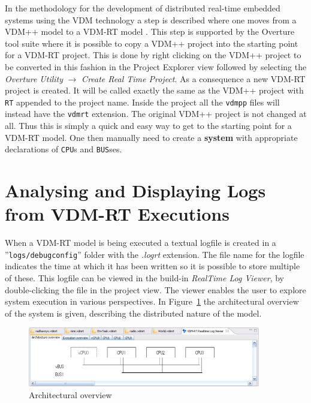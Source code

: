 \documentclass{overturerep}
\begin{document}
{In the methodology for the development of distributed real-time
embedded systems using the VDM technology a step is described where one
moves from a VDM++ model to a VDM-RT model \cite{Larsen&09b}. This
step is supported by the Overture tool suite where it is possible to
copy a VDM++ project into the starting point for a VDM-RT
project. This is done by right clicking on the VDM++ project to be
converted in this fashion in the Project Explorer view followed by 
selecting the \emph{Overture Utility}
$\rightarrow$ \emph{Create Real Time Project}. As a consequence a new VDM-RT project is
created. It will be called exactly the
same as the VDM++ project with \texttt{RT} appended to the project
name. Inside the project all the \texttt{vdmpp} files will instead
have the \texttt{vdmrt} extension. The original VDM++ project is not
changed at all. Thus this is simply a quick and easy way to get to the
starting point for a VDM-RT model. One then manually need to
create a {\ttfamily\bf system} with appropriate declarations of
\texttt{CPU}s and \texttt{BUS}ses.
 
\section{Analysing and Displaying Logs from VDM-RT Executions}\label{sec:showlog}

When a VDM-RT model is being executed a textual logfile is created in
a ''\texttt{logs/debugconfig}'' folder with the \emph{.logrt} extension. The
file name for the logfile indicates the time at which it has been
written so it is possible to store multiple of these. This logfile can be
viewed in the build-in \emph{RealTime Log Viewer},
by double-clicking the file in the project view. The viewer enables
the user to explore system execution in various perspectives. In
Figure~\ref{fig:userguide:ArchitecturalOverview} the architectural
overview of the system is given, describing the distributed nature of
the model.

\begin{figure}[htp]
\begin{center}
  \includegraphics[width=4in]{figures/ArchitectureOverview}
  \caption{Architectural overview}
  \label{fig:userguide:ArchitecturalOverview}
\end{center}
\end{figure}

}
\end{document}
